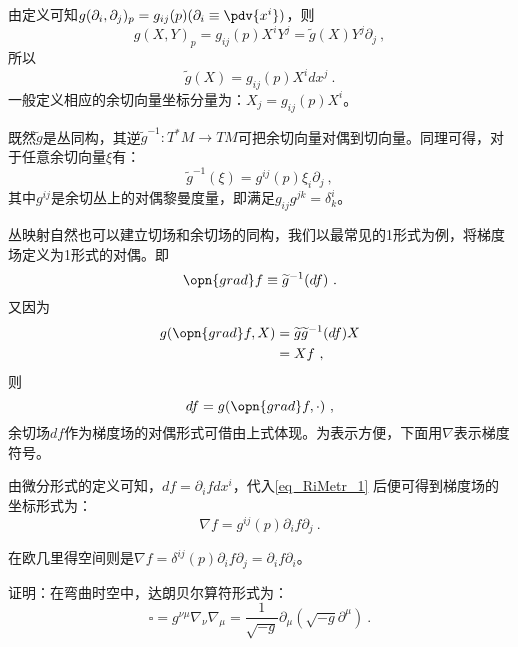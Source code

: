 由定义可知$g(\partial_i,\partial_j)_p=g_{ij}(p)(\partial_i\equiv\pdv{x^i})$，则
\begin{equation}
g(X,Y)_p=g_{ij}(p)X^iY^j=\widetilde g(X)Y^j\partial_j~,
\end{equation}
所以
\begin{equation}
\widetilde g(X)=g_{ij}(p)X^idx^j~.
\end{equation}
一般定义相应的余切向量坐标分量为：$X_j=g_{ij}(p)X^i$。

既然$\widetilde g$是丛同构，其逆$\widetilde g^{-1}:T^*M\rightarrow TM$可把余切向量对偶到切向量。同理可得，对于任意余切向量$\xi$有：
\begin{equation}\label{eq_RiMetr_1}
\widetilde g^{-1}(\xi)=g^{ij}(p) \xi_i\partial_j~,
\end{equation}
其中$g^{ij}$是余切丛上的对偶黎曼度量，即满足$g_{ij}g^{jk}=\delta^i_k$。

丛映射自然也可以建立切场和余切场的同构，我们以最常见的1形式为例，将梯度场定义为1形式的对偶。即
\begin{equation}
\opn{grad} f\equiv \widetilde g^{-1}(df)~.
\end{equation}
又因为
\begin{equation}
\begin{aligned}
g(\opn{grad}f,X)&=\widetilde g\widetilde g^{-1}(df)X\\
&=Xf~,
\end{aligned}
\end{equation}
则
\begin{equation}
df=g(\opn{grad}f,\cdot)~,
\end{equation}
余切场$df$作为梯度场的对偶形式可借由上式体现。为表示方便，下面用$\nabla$表示梯度符号。

由微分形式的定义可知，$df=\partial_i fdx^i$，代入\autoref{eq_RiMetr_1} 后便可得到梯度场的坐标形式为：
\begin{equation}
\nabla f=g^{ij}(p)\partial_i f\partial_j~.
\end{equation}

在欧几里得空间则是$\nabla f=\delta^{ij}(p)\partial_i f\partial_j=\partial_i f\partial_i$。
\begin{exercise}{}
证明：在弯曲时空中，达朗贝尔算符形式为：
\begin{equation}
\square=g^{\nu \mu} \nabla_{\nu} \nabla_{\mu}=\frac{1}{\sqrt{-g}} \partial_{\mu}\left(\sqrt{-g} \partial^{\mu}\right)~.
\end{equation}
\end{exercise}

